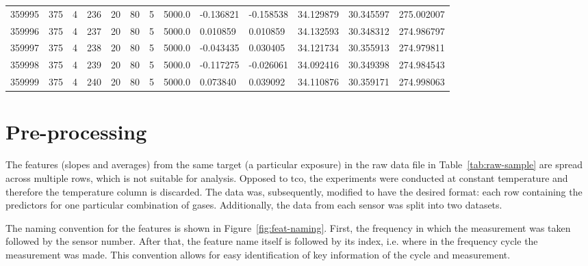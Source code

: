 \begin{table}
{\begin{tabular}{p{1.5cm}p{1.3cm}p{0.8cm}p{1.3cm}p{0.8cm}p{0.8cm}p{1.8cm}p{1.8cm}p{1.8cm}p{1.8cm}p{1.8cm}p{1.8cm}p{1.8cm}}
		359995 &          375 &         4 &        236 &        20 &         80 &          5 &     5000.0 &              -0.136821 &              -0.158538 &                34.129879 &                30.345597 &              275.002007 \\
		359996 &          375 &         4 &        237 &        20 &         80 &          5 &     5000.0 &               0.010859 &               0.010859 &                34.132593 &                30.348312 &              274.986797 \\
		359997 &          375 &         4 &        238 &        20 &         80 &          5 &     5000.0 &              -0.043435 &               0.030405 &                34.121734 &                30.355913 &              274.979811 \\
		359998 &          375 &         4 &        239 &        20 &         80 &          5 &     5000.0 &              -0.117275 &              -0.026061 &                34.092416 &                30.349398 &              274.984543 \\
		359999 &          375 &         4 &        240 &        20 &         80 &          5 &     5000.0 &               0.073840 &               0.039092 &                34.110876 &                30.359171 &              274.998063 \\
		\bottomrule[0.5mm]
	\end{tabular}}
\end{table}

\newpage
\section{Pre-processing}
\label{sec:preprocessing}

The features (slopes and averages) from the same target (a particular exposure) in the raw data file in Table~\ref{tab:raw-sample} are spread across multiple rows, which is not suitable for analysis. Opposed to \acrshort{tco}, the experiments were conducted at constant temperature and therefore the temperature column is discarded. The data was, subsequently, modified to have the desired format: each row containing the predictors for one particular combination of gases. Additionally, the data from each sensor was split into  two datasets. 

The naming convention for the features is shown in Figure~\ref{fig:feat-naming}. First, the frequency in which the measurement was taken followed by the sensor number. After that, the feature name itself is followed by its index, i.e. where in the frequency cycle the measurement was made. This convention allows for easy identification of key information of the cycle and measurement.

